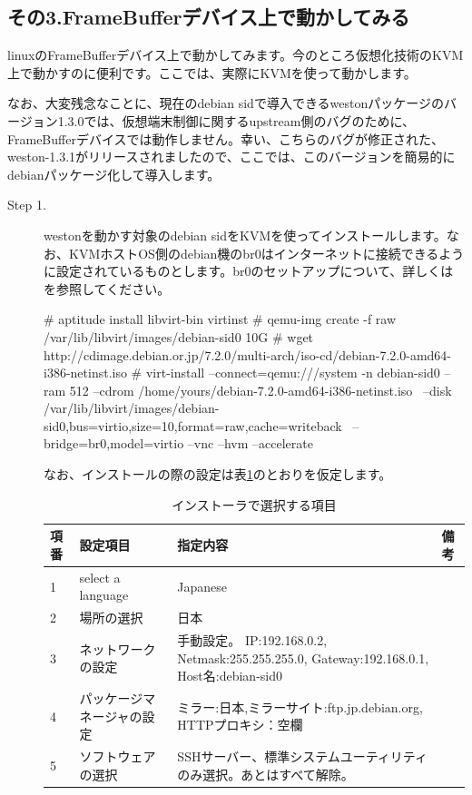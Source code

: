 \documentclass[mingoth,a4paper]{jsarticle}
\begin{document}
\subsection{その3.FrameBufferデバイス上で動かしてみる}

 linuxのFrameBufferデバイス上で動かしてみます。今のところ仮想化技術のKVM上で動かすのに便利です。ここでは、実際にKVMを使って動かします。

 なお、大変残念なことに、現在のdebian sidで導入できるwestonパッケージのバージョン1.3.0では、仮想端末制御に関するupstream側のバグのために、FrameBufferデバイスでは動作しません。幸い、こちらのバグが修正された、weston-1.3.1がリリースされましたので、ここでは、このバージョンを簡易的にdebianパッケージ化して導入します。

\begin{description}
\item [Step 1.]  westonを動かす対象のdebian sidをKVMを使ってインストールします。なお、KVMホストOS側のdebian機のbr0はインターネットに接続できるように設定されているものとします。br0のセットアップについて、詳しくは\cite{kde-devel-debian}を参照してください。
\begin{commandline}
# aptitude install libvirt-bin virtinst
# qemu-img create -f raw /var/lib/libvirt/images/debian-sid0 10G
# wget http://cdimage.debian.or.jp/7.2.0/multi-arch/iso-cd/debian-7.2.0-amd64-i386-netinst.iso
# virt-install --connect=qemu:///system -n debian-sid0 --ram 512  --cdrom /home/yours/debian-7.2.0-amd64-i386-netinst.iso \
  --disk /var/lib/libvirt/images/debian-sid0,bus=virtio,size=10,format=raw,cache=writeback \
  --bridge=br0,model=virtio --vnc --hvm --accelerate
\end{commandline}

 なお、インストールの際の設定は表\ref{tab:inst-settings}のとおりを仮定します。

\begin{table}[ht]
\begin{center}
\begin{tabular}{|l|p{5cm}|p{7cm}|l|}
\hline 
項番&設定項目&指定内容&備考\\
\hline \hline
1&select a language& Japanese& \\
2&場所の選択&日本&\\
3&ネットワークの設定&手動設定。 IP:192.168.0.2, Netmask:255.255.255.0, Gateway:192.168.0.1, Host名:debian-sid0& \\
4&パッケージマネージャの設定&ミラー:日本,ミラーサイト:ftp.jp.debian.org, HTTPプロキシ：空欄&\\
5&ソフトウェアの選択&SSHサーバー、標準システムユーティリティのみ選択。あとはすべて解除。& \\
\hline
\end{tabular}
\caption{\label{tab:inst-settings}インストーラで選択する項目}
\end{center}
\end{table}


\end{description}
\end{document}
